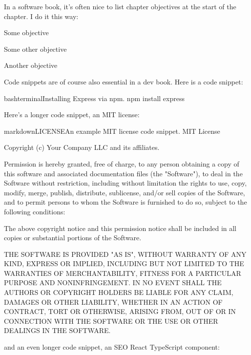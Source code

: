 \documentclass[a4paper,headinclude=on,footinclude=on,12pt,oneside]{scrbook}
\begin{document}
In a software book, it's often nice to list chapter objectives at the start of the chapter. I do it this way:

\begin{arrows}
\item Some objective
\item Some other objective
\item Another objective
\end{arrows}


Code snippets are of course also essential in a dev book. Here is a code snippet:

\begin{codeInput}{bash}{terminal}{Installing Express via npm.}
npm install express
\end{codeInput}

Here's a longer code snippet, an MIT license:

\begin{codeInput}{markdown}{LICENSE}{An example MIT license code snippet.}
MIT License

Copyright (c) Your Company LLC and its affiliates.

Permission is hereby granted, free of charge, to any person obtaining a copy
of this software and associated documentation files (the "Software"), to deal
in the Software without restriction, including without limitation the rights
to use, copy, modify, merge, publish, distribute, sublicense, and/or sell
copies of the Software, and to permit persons to whom the Software is
furnished to do so, subject to the following conditions:

The above copyright notice and this permission notice shall be included in all
copies or substantial portions of the Software.

THE SOFTWARE IS PROVIDED "AS IS", WITHOUT WARRANTY OF ANY KIND, EXPRESS OR
IMPLIED, INCLUDING BUT NOT LIMITED TO THE WARRANTIES OF MERCHANTABILITY,
FITNESS FOR A PARTICULAR PURPOSE AND NONINFRINGEMENT. IN NO EVENT SHALL THE
AUTHORS OR COPYRIGHT HOLDERS BE LIABLE FOR ANY CLAIM, DAMAGES OR OTHER
LIABILITY, WHETHER IN AN ACTION OF CONTRACT, TORT OR OTHERWISE, ARISING FROM,
OUT OF OR IN CONNECTION WITH THE SOFTWARE OR THE USE OR OTHER DEALINGS IN THE
SOFTWARE.
\end{codeInput}

and an even longer code snippet, an SEO React TypeScript component:
\end{document}
